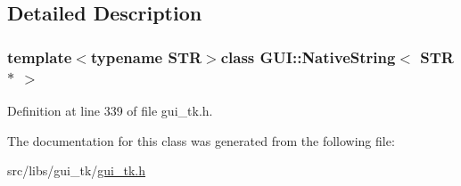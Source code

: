 \subsection{Detailed Description}
\subsubsection*{template$<$typename S\-T\-R$>$class G\-U\-I\-::\-Native\-String$<$ S\-T\-R $\ast$ $>$}



Definition at line 339 of file gui\-\_\-tk.\-h.



The documentation for this class was generated from the following file\-:\begin{DoxyCompactItemize}
\item 
src/libs/gui\-\_\-tk/\hyperlink{gui__tk_8h}{gui\-\_\-tk.\-h}\end{DoxyCompactItemize}
